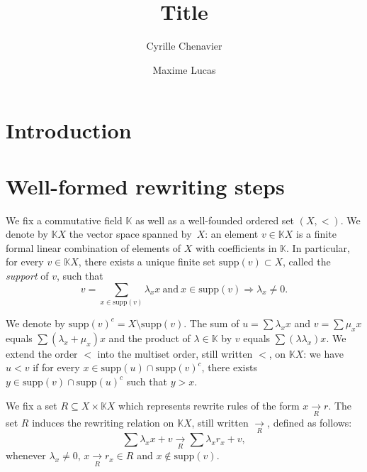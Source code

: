 \documentclass[10pt]{easychair}
\theoremstyle{definition}
\newcommand\K{\mathbb{K}}
\newcommand\KX{\K X}
\newcommand\supp{\text{supp}}
\newcommand\rewR{\underset{R}{\longrightarrow}}
\begin{document}
\title{Title}

\author{
Cyrille Chenavier
\and
Maxime Lucas
}



\maketitle

\begin{abstract}

  
\end{abstract}
 
\section{Introduction}

\section{Well-formed rewriting steps}

We fix a commutative field $\K$ as well as a well-founded ordered set
$(X,<)$. We denote by $\KX$ the vector space spanned by~$X$: an element
$v\in\KX$ is a finite formal linear combination of elements of $X$ with
coefficients in $\K$. In particular, for every $v\in\KX$, there exists a
unique finite set $\supp(v)\subset X$, called the \emph{support} of $v$,
such that
\begin{equation}\label{equ:support}
  v=\sum_{x\in\supp(v)}\lambda_xx\ \text{and}\ x\in\supp(v)\Rightarrow\lambda_x
  \neq 0.
\end{equation}

\smallskip
\noindent
We denote by $\supp(v)^c=X\setminus\supp(v)$. The sum of
$u=\sum\lambda_xx$ and $v=\sum\mu_xx$ equals $\sum(\lambda_x+\mu_x)x$ and
the product of $\lambda\in\K$ by $v$ equals $\sum(\lambda\lambda_x)x$. We
extend the order $<$ into the multiset order, still written $<$, on
$\KX$: we have $u<v$ if for every $x\in\supp(u)\cap\supp(v)^c$, there
exists $y\in\supp(v)\cap\supp(u)^c$ such that $y>x$.

\medskip

We fix a set $R\subseteq X\times\KX$ which represents rewrite rules of
the form $x\rewR r$. The set $R$ induces the rewriting relation on $\KX$,
still written $\rewR$, defined as follows:
\begin{equation}\label{equ:rewriting_step}
  \sum\lambda_xx+v\rewR\sum\lambda_xr_x+v,
\end{equation}
whenever $\lambda_x\neq 0$, $x\rewR r_x\in R$ and $x\notin\supp(v)$. 
\end{document}
